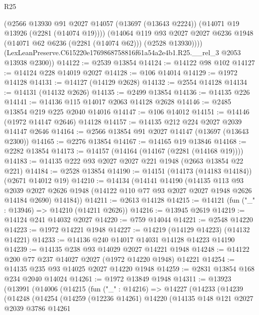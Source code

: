 \begin{lexlean}{R25}
\begin{coremodule}
          (@2566
            @13930
            @91
            @2027
            @14057
            (@13697 (@13643 @2224))
            (@14071 @19 @13926 (@2281 (@14074 @19))))
          (@14064
            @119
            @93
            @2027
            @2027
            @6236
            @1948
            (@14071 @62 @6236 (@2281 (@14074 @62)))
            (@2528 @13930))))
      (LexLeanPreserve.C615220e1769868758816f61a54a2e4b1.R25.__rel_3 @2053 @13938 @2300))
@14122 := @2539 @13854
@14124 := @14122 @98 @102
@14127 := @14124 @228 @14019 @2027
@14128 := @106 @14014
@14129 := @1972 @14128
@14131 := @14127 (@14129 @2628)
@14132 := @2554 @14128
@14134 := @14131 (@14132 @2626)
@14135 := @2499 @13854
@14136 := @14135 @226
@14141 := @14136 @115 @14017 @2063 @14128 @2628
@14146 := @2485 @13854 @219 @225 @2040 @14016
@14147 := @106 @14012
@14151 := @14146 (@1972 @14147 @2646) @14128
@14157 := @14135 @212 @224 @2027 @2039 @14147 @2646
@14164 := @2566 @13854 @91 @2027 @14147 (@13697 (@13643 @2300))
@14165 := @2276 @13854
@14167 := @14165 @19 @13846
@14168 := @2282 @13854
@14173 := @14157 (@14164 (@14167 (@2281 (@14168 @19))))
@14183 := @14135 @222 @93 @2027 @2027 @221 @1948 (@2663 @13854 @22 @221)
@14184 := @2528 @13854
@14190 := @14151 (@14173 (@14183 @14184)) (@2671 @14012 @19)
@14210 := @14134
    (@14141
      @14190
      (@14135
        @113
        @93
        @2039
        @2027
        @2626
        @1948
        (@14122 @110 @77 @93 @2027 @2027 @1948 @2626 @14184 @2690)
        @14184))
@14211 := @2613 @14128
@14215 := @14121 (fun ("_" : @13946) => @14210 (@14211 @2626))
@14216 := @13945 @2619
@14219 := @14124 @241 @14032 @2027
@14220 := @759 @14044
@14221 := @2548 @14220
@14223 := @1972 @14221 @1948
@14227 := @14219 (@14129 @14223) (@14132 @14221)
@14233 := @14136 @240 @14017 @14031 @14128 @14223 @14190
@14239 := @14135 @238 @93 @14029 @2027 @14221 @1948
@14248 := @14122 @200 @77 @237 @14027 @2027 (@1972 @14220 @1948) @14221
@14254 := @14135 @235 @93 @14025 @2027 @14220 @1948
@14259 := @2831 @13854 @168 @234 @2040 @14024
@14261 := @1972 @13849 @1948
@14311 := @13923
    (@13991
      (@14006
        (@14215
          (fun ("_" : @14216) =>
          @14227
            (@14233
              (@14239
                (@14248
                  (@14254
                    (@14259
                      (@12236 @14261)
                      @14220
                      (@14135
                        @148
                        @121
                        @2027
                        @2039
                        @3786
                        @14261

\end{coremodule}
\end{lexlean}
